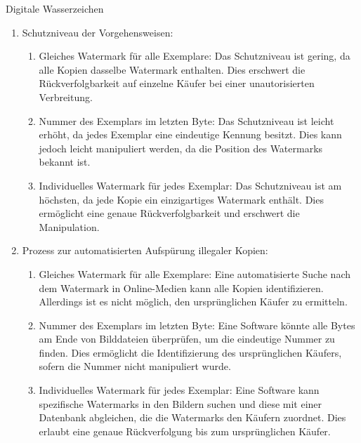\documentclass{article}
\begin{document}
\begin{exercise}{Digitale Wasserzeichen}
  \begin{solution}
    \begin{enumerate}
      \item Schutzniveau der Vorgehensweisen:
            \begin{enumerate}
              \item Gleiches Watermark für alle Exemplare: Das Schutzniveau ist gering, da alle Kopien dasselbe Watermark enthalten. Dies erschwert die Rückverfolgbarkeit auf einzelne Käufer bei einer unautorisierten Verbreitung.
              \item Nummer des Exemplars im letzten Byte: Das Schutzniveau ist leicht erhöht, da jedes Exemplar eine eindeutige Kennung besitzt. Dies kann jedoch leicht manipuliert werden, da die Position des Watermarks bekannt ist.
              \item Individuelles Watermark für jedes Exemplar: Das Schutzniveau ist am höchsten, da jede Kopie ein einzigartiges Watermark enthält. Dies ermöglicht eine genaue Rückverfolgbarkeit und erschwert die Manipulation.
            \end{enumerate}
      \item Prozess zur automatisierten Aufspürung illegaler Kopien:
            \begin{enumerate}
              \item Gleiches Watermark für alle Exemplare: Eine automatisierte Suche nach dem Watermark in Online-Medien kann alle Kopien identifizieren. Allerdings ist es nicht möglich, den ursprünglichen Käufer zu ermitteln.
              \item Nummer des Exemplars im letzten Byte: Eine Software könnte alle Bytes am Ende von Bilddateien überprüfen, um die eindeutige Nummer zu finden. Dies ermöglicht die Identifizierung des ursprünglichen Käufers, sofern die Nummer nicht manipuliert wurde.
              \item Individuelles Watermark für jedes Exemplar: Eine Software kann spezifische Watermarks in den Bildern suchen und diese mit einer Datenbank abgleichen, die die Watermarks den Käufern zuordnet. Dies erlaubt eine genaue Rückverfolgung bis zum ursprünglichen Käufer.
            \end{enumerate}
    \end{enumerate}
  \end{solution}
\end{exercise}
\end{document}
